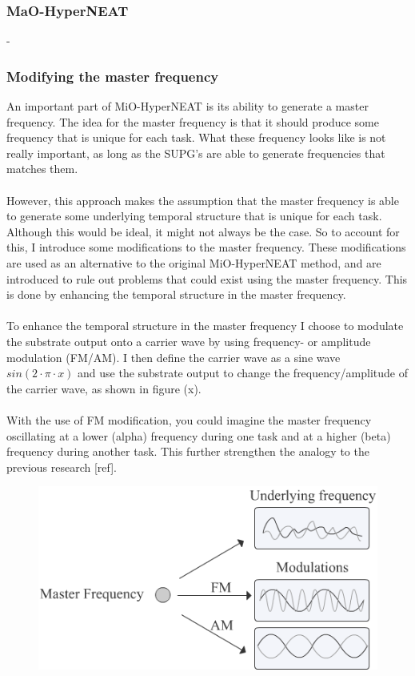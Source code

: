 \documentclass[11pt, a4paper]{article}
\begin{document}
\subsubsection{MaO-HyperNEAT}
-
\subsubsection{Modifying the master frequency}
An important part of MiO-HyperNEAT is its ability to generate a master frequency. The idea for the master frequency is that it should produce some frequency that is unique for each task. What these frequency looks like is not really important, as long as the SUPG's are able to generate frequencies that matches them.
\\
\\
However, this approach makes the assumption that the master frequency is able to generate some underlying temporal structure that is unique for each task. Although this would be ideal, it might not always be the case. So to account for this, I introduce some modifications to the master frequency. These modifications are used as an alternative to the original MiO-HyperNEAT method, and are introduced to rule out problems that could exist using the master frequency. This is done by enhancing the temporal structure in the master frequency.
\\
\\
To enhance the temporal structure in the master frequency I choose to modulate the substrate output onto a carrier wave by using frequency- or amplitude modulation (FM/AM). I then define the carrier wave as  a sine wave $ sin(2 \cdot \pi \cdot x) $ and use the substrate output to change the frequency/amplitude of the carrier wave, as shown in figure (x).
\\
\\
With the use of FM modification, you could imagine the master frequency oscillating at a lower (alpha) frequency during one task and at a higher (beta) frequency during another task. This further strengthen the analogy to the previous research [ref].
\begin{figure}[!ht]
\centering
\includegraphics[scale=0.4]{Images/MasterFrequencyModulation}
\caption{}
\end{figure}
\end{document}
